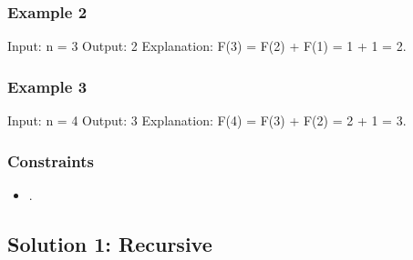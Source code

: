 \documentclass[letterpaper,12pt,english]{book}
\begin{document}
\subsubsection{Example 2}
\label{\detokenize{Dynamic_Programming/05_DP_509_Fibonacci_Number:example-2}}
\begin{sphinxVerbatim}[commandchars=\\\{\}]
Input: n = 3
Output: 2
Explanation: F(3) = F(2) + F(1) = 1 + 1 = 2.
\end{sphinxVerbatim}


\subsubsection{Example 3}
\label{\detokenize{Dynamic_Programming/05_DP_509_Fibonacci_Number:example-3}}
\begin{sphinxVerbatim}[commandchars=\\\{\}]
Input: n = 4
Output: 3
Explanation: F(4) = F(3) + F(2) = 2 + 1 = 3.
\end{sphinxVerbatim}


\subsubsection{Constraints}
\label{\detokenize{Dynamic_Programming/05_DP_509_Fibonacci_Number:constraints}}\begin{itemize}
\item {} 
\sphinxAtStartPar
{}.

\end{itemize}


\subsection{Solution 1: Recursive}
\label{\detokenize{Dynamic_Programming/05_DP_509_Fibonacci_Number:solution-1-recursive}}
\end{document}
